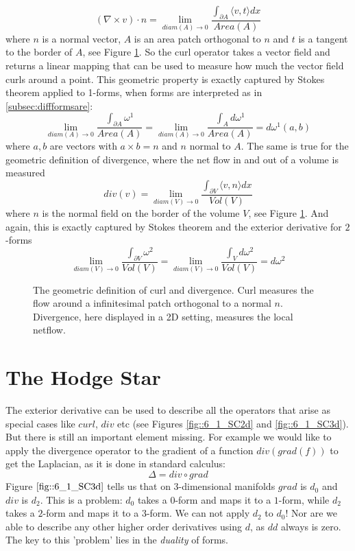 \[(\nabla \times v) \cdot n = \lim_{diam(A)\rightarrow 0 } \frac{\int_{\partial A} \langle v , t \rangle dx}{Area(A)} \]
where $n$ is a normal vector, $A$ is an area patch orthogonal to $n$ and $t$ is a tangent to the border of $A$, see Figure \ref{fig:6_curlDiv}. So the curl operator takes a vector field and returns a linear mapping that can be used to measure how much the vector field curls around a point. This geometric property is exactly captured by Stokes theorem applied to 1-forms, when forms are interpreted as in \ref{subsec:diffformsare}:
\[\lim_{diam(A)\rightarrow 0 }\frac{\int_{\partial A} \omega^1}{Area(A)} = \lim_{diam(A)\rightarrow 0 }\frac{\int_{A} d \omega^1}{Area(A)} = d \omega^1 (a,b)\]
where $a,b$ are vectors with $a\times b = n$ and $n$ normal to $A$.
The same is true for the geometric definition of divergence, where the net flow in and out of a volume is measured
\[div(v) = \lim_{diam(V)\rightarrow 0 } \frac{\int_{\partial V} \langle v , n \rangle dx}{Vol(V)}\]
where $n$ is the normal field on the border of the volume $V$, see Figure \ref{fig:6_curlDiv}. And again, this is exactly captured by Stokes theorem and the exterior derivative for $2$-forms
\[\lim_{diam(V)\rightarrow 0 }\frac{\int_{\partial V} \omega^2}{Vol(V)} = \lim_{diam(V)\rightarrow 0 }\frac{\int_{V} d \omega^2}{Vol(V)} = d \omega^2\]

\begin{figure}%
\begin{center}
\def\svgwidth{8cm}
%	
\end{center}
\caption{The geometric definition of curl and divergence. Curl measures the flow around a infinitesimal patch orthogonal to a normal $n$. Divergence, here displayed in a 2D setting, measures the local netflow. }%
\label{fig:6_curlDiv}%
\end{figure}


\section{The Hodge Star}

\label{sec:hodgeStar}
The exterior derivative can be used to describe all the operators that arise as special cases like $curl$, $div$ etc (see Figures \ref{fig::6_1_SC2d} and \ref{fig::6_1_SC3d}). But there is still an important element missing. For example we would like to apply the divergence operator to the gradient of a function $div(grad(f))$ to get the Laplacian, as it is done in standard calculus:
\[\Delta = div\circ grad\]
Figure $\ref{fig::6_1_SC3d}$ tells us that on 3-dimensional manifolds $grad$ is $d_0$ and $div$ is $d_2$.   This is a problem: $d_0$ takes a $0$-form and maps it to a $1$-form, while $d_2$ takes a $2$-form and maps it to a $3$-form. We can not apply $d_2$ to $d_0$! Nor are we able to describe any other higher order derivatives using $d$, as $dd$ always is zero.
The key to this 'problem' lies in the \emph{duality} of forms. 

